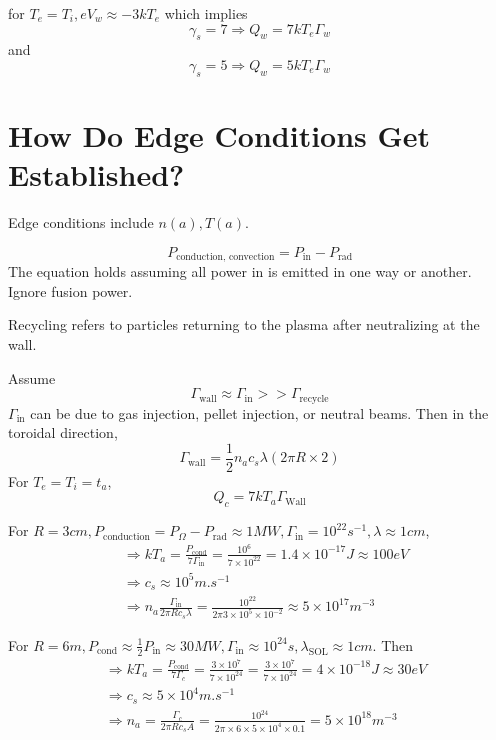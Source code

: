\documentclass[12pt]{article}
\begin{document}
for $T_e = T_i, eV_w \approx -3kT_e$ which implies
$$\gamma_s = 7 \Rightarrow Q_w = 7kT_e\Gamma_w$$
and
$$\gamma_s = 5 \Rightarrow Q_w = 5kT_e\Gamma_w$$


\section{How Do Edge Conditions Get Established?}

Edge conditions include $n(a), T(a)$.

$$P_{\text{conduction, convection}} = P_{\text{in}} - P_{\text{rad}}$$
The equation holds assuming all power in is emitted in one way or another. Ignore fusion power.

\begin{defn}[Recycling]
    Recycling refers to particles returning to the plasma after neutralizing at the wall.
\end{defn}

Assume
$$\Gamma_{\text{wall}} \approx \Gamma_{\text{in}} >> \Gamma_{\text{recycle}}$$
$\Gamma_{\text{in}}$ can be due to gas injection, pellet injection, or neutral beams. Then in the toroidal direction,
$$\Gamma_{\text{wall}} = \frac{1}{2} n_a c_s \lambda(2\pi R \times 2)$$
For $T_e = T_i = t_a$,
$$Q_c = 7kT_a\Gamma_{\text{Wall}}$$

\begin{ex}[JET]
    For $R = 3\unit{cm}, P_{\text{conduction}} = P_\Omega - P_{\text{rad}} \approx 1\unit{MW}, \Gamma_{\text{in}} = 10^{22} \unit{s^{-1}}, \lambda \approx 1\unit{cm}$,
    \begin{align*}
        &\Rightarrow kT_a = \frac{P_{\text{cond}}}{7\Gamma_{\text{in}}} = \frac{10^6}{7 \times 10^{22}} = 1.4 \times 10^{-17}\unit{J} \approx 100 \unit{eV} \\
        &\Rightarrow c_s \approx 10^5 \unit{m.s^{-1}} \\
        &\Rightarrow n_a \frac{\Gamma_{\text{in}}}{2\pi Rc_s\lambda} = \frac{10^{22}}{2\pi 3 \times 10^5 \times 10^{-2}} \approx 5 \times 10^{17}\unit{m^{-3}}
    \end{align*}
\end{ex}

\begin{ex}[ITER]
    For $R = 6\unit{m}, P_{\text{cond}} \approx \frac{1}{2} P_{\text{in}} \approx 30\unit{MW}, \Gamma_{\text{in}} \approx 10^{24}\unit{s}, \lambda_{\text{SOL}} \approx 1\unit{cm}$. Then
    \begin{align*}
        &\Rightarrow kT_a = \frac{P_{\text{cond}}}{7\Gamma_c} = \frac{3\times10^7}{7\times10^{24}} = \frac{3\times10^7}{7\times10^{24}} = 4 \times 10^{-18} \unit{J} \approx 30\unit{eV} \\
        &\Rightarrow c_s \approx 5 \times 10^4 \unit{m.s^{-1}} \\
        &\Rightarrow n_a = \frac{\Gamma_c}{2\pi Rc_sA} = \frac{10^{24}}{2\pi \times 6 \times 5 \times 10^4 \times 0.1} = 5 \times 10^{18}\unit{m^{-3}}
    \end{align*}
\end{ex}
\end{document}
